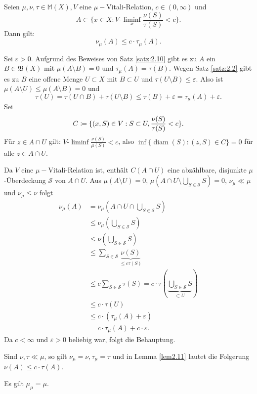 \documentclass[a4paper,twoside,DIV15,BCOR12mm]{scrbook}
\newcommand{\borel}{\mathfrak B}
\DeclareMathOperator{\diam}{diam}
\begin{document}
\begin{lemma}
\label{lem2.11}
Seien \(\mu, \nu, \tau \in \mathbb{M}(X), V\) eine \(\mu-\)Vitali-Relation, \(c \in (0,\infty)\) und \[A \subset \{ x \in X : V\text{-}\liminf_x \frac{\nu(S)}{\tau(S)} < c \}.\]
Dann gilt: 
$$
\nu_\mu(A) \leq c \cdot \tau_\mu(A).
$$
\end{lemma}

\begin{beweis}
Sei \(\varepsilon > 0\). Aufgrund des Beweises von Satz \ref{satz:2.10} gibt es zu $A$ ein \(B \in \borel(X)\) mit \(\mu(A \setminus B)=0\) und \(\tau_\mu(A) = \tau(B)\).
Wegen Satz \ref{satz:2.2} gibt es zu $B$ eine offene Menge \(U \subset X\) mit \(B \subset U\) und \(\tau(U \setminus B) \leq \varepsilon\). Also ist \(\mu(A \setminus U) \leq \mu(A \setminus B)=0\) und
\[
\tau(U) = \tau(U \cap B) + \tau(U \setminus B) \leq \tau(B) + \varepsilon = \tau_\mu(A) + \varepsilon.
\]
Sei 
$$
C \da \{ (x,S) \in V : S \subset U , \frac{\nu(S)}{\tau(S)} < c \}.
$$ 
Für \(z\in A\cap U\) gilt: \(V\text{-}\liminf\frac{\nu(S)}{\mu(S)} < c\), also \(\inf\{\diam(S):(z,S)\in C\}=0\) für alle \(z \in A \cap U\). 

Da \(V\) eine \(\mu-\)Vitali-Relation ist, enthält \(C(A\cap U)\) eine abzählbare, disjunkte \(\mu\)-Überdeckung \(\mathcal{S}\) von \(A\cap U\). Aus \(\mu(A \setminus U)=0\), \(\mu(A\cap U \setminus \bigcup_{S\in \mathcal{S}} S) = 0\), \(\nu_\mu \ll \mu\) und \(\nu_\mu \leq \nu\) folgt
\begin{align*}
\nu_\mu(A) &= \nu_\mu(A\cap U \cap \bigcup_{S\in\mathcal{S}}S) \\
&\leq \nu_\mu(\bigcup_{S\in\mathcal{S}} S) \\
&\leq \nu(\bigcup_{S\in\mathcal{S}} S) \\
&\leq \sum_{S\in\mathcal{S}}\underbrace{\nu(S)}_{\leq c\tau(S)}\\
&\leq c\sum_{S\in\mathcal{S}} \tau(S) = c\cdot \tau(\underbrace{\bigcup_{S\in\mathcal{S}}S}_{\subset U})\\
&\leq c\cdot\tau(U) \\
&\leq c\cdot(\tau_\mu(A)+\varepsilon) \\
&= c\cdot\tau_\mu(A)+c\cdot\varepsilon.
\end{align*}
Da \(c<\infty\) und \(\varepsilon>0\) beliebig war, folgt die Behauptung.
\end{beweis}

\begin{bemerkungen}
	\item Sind \(\nu,\tau \ll \mu\), so gilt \(\nu_\mu=\nu, \tau_\mu=\tau\) und in Lemma \ref{lem2.11} lautet die Folgerung \(\nu(A) \leq c\cdot\tau(A)\).
	\item Es gilt \(\mu_\mu=\mu\).
\end{bemerkungen}
\end{document}
